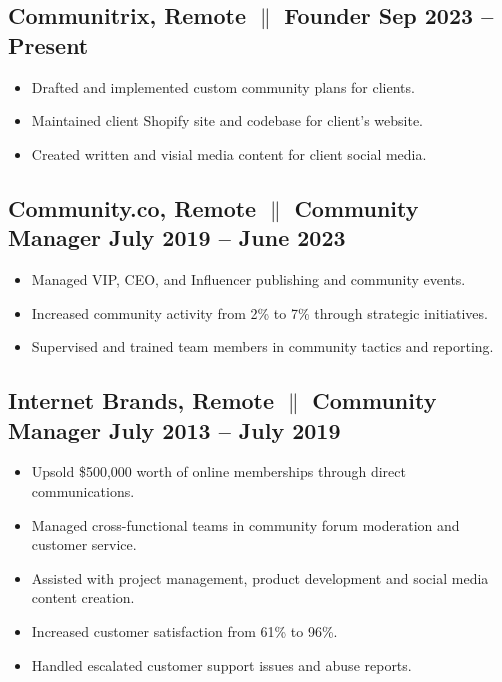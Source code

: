 \documentclass[a4paper,10pt]{article}
\begin{document}
\subsection{Communitrix, Remote {$\parallel$}{ Founder} \hfill
      \textbf{Sep 2023 – Present}}
\begin{itemize}
      \item Drafted and implemented custom community plans for clients.
      \item Maintained client Shopify site and codebase for client's website.
      \item Created written and visial media content for client social media.
\end{itemize}

\subsection{Community.co, Remote {$\parallel$}{ Community Manager} \hfill
      \textbf{July 2019 – June
            2023}}
\begin{itemize}
      \item Managed VIP, CEO, and Influencer publishing and community
            events.
      \item Increased community activity from 2\% to 7\% through
            strategic
            initiatives.
      \item Supervised and trained team members in community tactics and reporting.
\end{itemize}

\subsection{Internet Brands, Remote {$\parallel$}{ Community Manager} \hfill
      \textbf{July 2013 – July
            2019}}
\begin{itemize}
      \item Upsold \$500,000 worth of online memberships through direct communications.
      \item Managed cross-functional teams in community forum moderation and customer
            service.
      \item Assisted with project management, product development and social media content creation.
      \item Increased customer satisfaction from 61\%
            to
            96\%.
      \item Handled escalated customer support issues and abuse reports.
\end{itemize}
\end{document}
